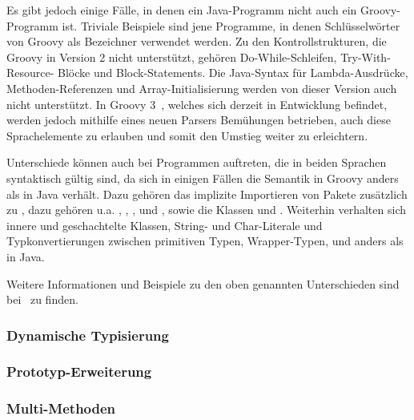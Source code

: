 Es gibt jedoch einige Fälle, in denen ein Java-Programm nicht auch ein Groovy-Programm ist.
Triviale Beispiele sind jene Programme, in denen Schlüsselwörter von Groovy als Bezeichner verwendet werden.
Zu den Kontrollstrukturen, die Groovy in Version 2 nicht unterstützt, gehören Do-While-Schleifen, Try-With-Resource- Blöcke und Block-Statements.
Die Java-Syntax für Lambda-Ausdrücke, Methoden-Referenzen und Array-Initialisierung werden von dieser Version auch nicht unterstützt.
In Groovy 3~\cite{groovy-lang:release3}, welches sich derzeit in Entwicklung befindet, werden jedoch mithilfe eines neuen Parsers Bemühungen betrieben, auch diese Sprachelemente zu erlauben und somit den Umstieg weiter zu erleichtern.

Unterschiede können auch bei Programmen auftreten, die in beiden Sprachen syntaktisch gültig sind, da sich in einigen Fällen die Semantik in Groovy anders als in Java verhält.
Dazu gehören das implizite Importieren von Pakete zusätzlich zu , dazu gehören {u.a.} , , ,  und , sowie die Klassen  und .
Weiterhin verhalten sich innere und geschachtelte Klassen, String- und Char-Literale und Typkonvertierungen zwischen primitiven Typen, Wrapper-Typen,  und  anders als in Java.

Weitere Informationen und Beispiele zu den oben genannten Unterschieden sind bei~\cite{groovy-lang:differences} zu finden.

\subsubsection{Dynamische Typisierung}\label{subsubsec:dynamische-typisierung}


\subsubsection{Prototyp-Erweiterung}


\subsubsection{Multi-Methoden}

